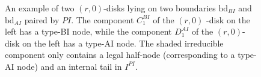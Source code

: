 \documentclass[11pt]{amsart}
\theoremstyle{definition}
\theoremstyle{remark}
\newcommand{\<}{\left<}
\renewcommand{\>}{\right>}
\numberwithin{equation}{section}
\begin{document}
\begin{figure}[h]
\begin{subfigure}{.45\textwidth}
\end{subfigure}

        \caption{An example of two $(r,0)$-disks lying on two boundaries $\text{bd}_{BI}$ and $\text{bd}_{AI}$ paired by $PI$. The component $C_1^{BI}$ of the $(r,0)$%
-disk on the left has %
a type-BI node, while the component $D_1^{AI}$ of the $(r,0)$-disk on the left has a type-AI node. The shaded irreducible component only contains a legal half-node (corresponding to a type-AI node) and an internal tail in $I^{PI}$. }
        \label{fig rh surface}
    \end{figure}
\end{document}
